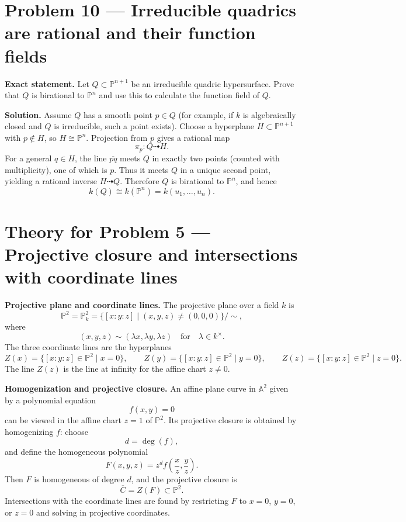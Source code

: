\documentclass[12pt,a4paper]{article}
\theoremstyle{plain}
\theoremstyle{definition}      %
\begin{document}
\section*{Problem 10 — Irreducible quadrics are rational and their function fields}

\textbf{Exact statement.}
Let $Q\subset \mathbb{P}^{n+1}$ be an irreducible quadric hypersurface.
Prove that $Q$ is birational to $\mathbb{P}^n$ and use this to calculate the function field of $Q$.

\textbf{Solution.}
Assume $Q$ has a smooth point $p\in Q$ (for example, if $k$ is algebraically closed and $Q$ is irreducible, such a point exists).
Choose a hyperplane $H\subset \mathbb{P}^{n+1}$ with $p\notin H$, so $H\cong \mathbb{P}^n$.
Projection from $p$ gives a rational map
\[
\pi_p:Q\dashrightarrow H.
\]
For a general $q\in H$, the line $\overline{pq}$ meets $Q$ in exactly two points (counted with multiplicity), one of which is $p$.
Thus it meets $Q$ in a unique second point, yielding a rational inverse $H\dashrightarrow Q$.
Therefore $Q$ is birational to $\mathbb{P}^n$, and hence
\[
k(Q)\cong k(\mathbb{P}^n)=k(u_1,\dots,u_n).
\]


\section*{Theory for Problem 5 — Projective closure and intersections with coordinate lines}

\textbf{Projective plane and coordinate lines.}
The projective plane over a field $k$ is
\[
\mathbb{P}^2=\mathbb{P}^2_k=\{[x:y:z]\mid (x,y,z)\neq (0,0,0)\}/\sim,
\]
where
\[
(x,y,z)\sim (\lambda x,\lambda y,\lambda z)
\quad\text{for}\quad
\lambda\in k^\times.
\]
The three coordinate lines are the hyperplanes
\[
Z(x)=\{[x:y:z]\in \mathbb{P}^2\mid x=0\},
\qquad
Z(y)=\{[x:y:z]\in \mathbb{P}^2\mid y=0\},
\qquad
Z(z)=\{[x:y:z]\in \mathbb{P}^2\mid z=0\}.
\]
The line $Z(z)$ is the line at infinity for the affine chart $z\neq 0$.

\textbf{Homogenization and projective closure.}
An affine plane curve in $\mathbb{A}^2$ given by a polynomial equation
\[
f(x,y)=0
\]
can be viewed in the affine chart $z=1$ of $\mathbb{P}^2$.
Its projective closure is obtained by homogenizing $f$:
choose
\[
d=\deg(f),
\]
and define the homogeneous polynomial
\[
F(x,y,z)=z^d f\!\left(\frac{x}{z},\frac{y}{z}\right).
\]
Then $F$ is homogeneous of degree $d$, and the projective closure is
\[
\overline{C}=Z(F)\subset \mathbb{P}^2.
\]
Intersections with the coordinate lines are found by restricting $F$ to $x=0$, $y=0$, or $z=0$ and solving in projective coordinates.
\end{document}
